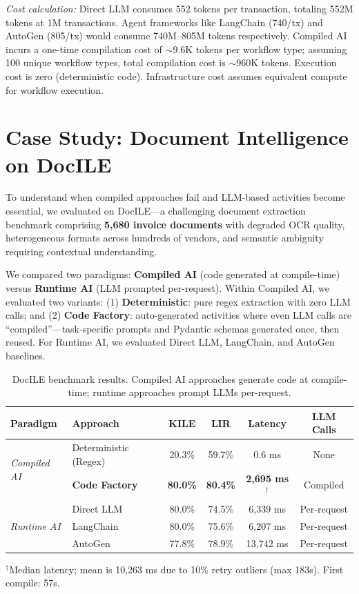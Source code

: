 \documentclass[11pt]{article}
\begin{document}
\noindent\textit{Cost calculation:} Direct LLM consumes 552 tokens per transaction, totaling 552M tokens at 1M transactions. Agent frameworks like LangChain (740/tx) and AutoGen (805/tx) would consume 740M--805M tokens respectively. Compiled AI incurs a one-time compilation cost of $\sim$9.6K tokens per workflow type; assuming 100 unique workflow types, total compilation cost is $\sim$960K tokens. Execution cost is zero (deterministic code). Infrastructure cost assumes equivalent compute for workflow execution.

\section{Case Study: Document Intelligence on DocILE}
\label{sec:docile}

To understand when compiled approaches fail and LLM-based activities become essential, we evaluated on DocILE---a challenging document extraction benchmark comprising \textbf{5,680 invoice documents} with degraded OCR quality, heterogeneous formats across hundreds of vendors, and semantic ambiguity requiring contextual understanding.

We compared two paradigms: \textbf{Compiled AI} (code generated at compile-time) versus \textbf{Runtime AI} (LLM prompted per-request). Within Compiled AI, we evaluated two variants: (1) \textbf{Deterministic}: pure regex extraction with zero LLM calls; and (2) \textbf{Code Factory}: auto-generated activities where even LLM calls are ``compiled''---task-specific prompts and Pydantic schemas generated once, then reused. For Runtime AI, we evaluated Direct LLM, LangChain, and AutoGen baselines.

\begin{table}[h]
\centering
\caption{DocILE benchmark results. Compiled AI approaches generate code at compile-time; runtime approaches prompt LLMs per-request.}
\label{tab:docile-main}
\begin{tabular}{llcccc}
\toprule
\textbf{Paradigm} & \textbf{Approach} & \textbf{KILE} & \textbf{LIR} & \textbf{Latency} & \textbf{LLM Calls} \\
\midrule
\multirow{2}{*}{\textit{Compiled AI}}
  & Deterministic (Regex) & 20.3\% & 59.7\% & 0.6 ms & None \\
  & \textbf{Code Factory} & \textbf{80.0\%} & \textbf{80.4\%} & \textbf{2,695 ms}$^\dagger$ & Compiled \\
\midrule
\multirow{3}{*}{\textit{Runtime AI}}
  & Direct LLM & 80.0\% & 74.5\% & 6,339 ms & Per-request \\
  & LangChain & 80.0\% & 75.6\% & 6,207 ms & Per-request \\
  & AutoGen & 77.8\% & 78.9\% & 13,742 ms & Per-request \\
\bottomrule
\end{tabular}
\vspace{0.5em}
\small{$^\dagger$Median latency; mean is 10,263 ms due to 10\% retry outliers (max 183s). First compile: 57s.}
\end{table}
\end{document}
